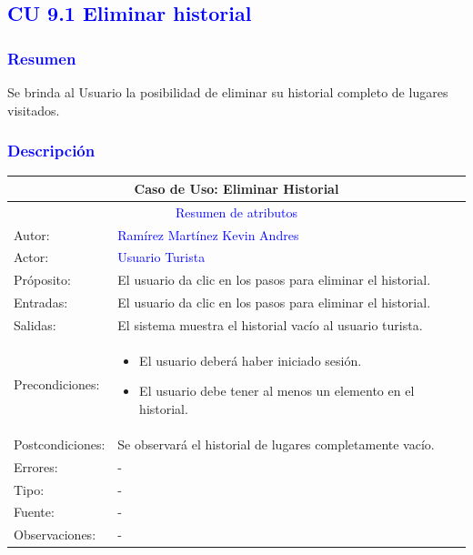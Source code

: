 \subsection{\textcolor{blue}{CU 9.1 Eliminar historial}}

\subsubsection{\textcolor{blue}{Resumen}}
Se brinda al Usuario la posibilidad de eliminar su historial completo de lugares visitados.
\subsubsection{\textcolor{blue}{Descripción}}
\begin{tabularx}{16cm}{||l|X||}
	\hline
	\multicolumn{2}{||c||}{Caso de Uso: Eliminar Historial} \\
	\hline
	\multicolumn{2}{||c||}{\textcolor{blue}{Resumen de atributos}} \\
 \hline
	{Autor:} & {\textcolor{blue}{Ramírez Martínez Kevin Andres}} \\
	\hline
	\hline
	{Actor:} & {\textcolor{blue}{Usuario Turista}} \\
	\hline
	{Próposito:} & El usuario da clic en los pasos para eliminar el historial.\\
	\hline
	{Entradas:} & El usuario da clic en los pasos para eliminar el historial.
        \\
	\hline
	{Salidas:} & El sistema muestra el historial vacío al usuario turista.\\
	\hline
	{Precondiciones:} & 
        \begin{itemize}
            \item El usuario deberá haber iniciado sesión.
            \item El usuario debe tener al menos un elemento en el historial.
        \end{itemize}\\ 
	\hline
	{Postcondiciones:} & Se observará el historial de lugares completamente vacío.\\
	\hline
	{Errores:} & {-} \\
	\hline
	{Tipo:} & {-}\\
	\hline
	{Fuente:} & {-} \\
	\hline
	{Observaciones:} & {-} \\
	\hline
\end{tabularx}

